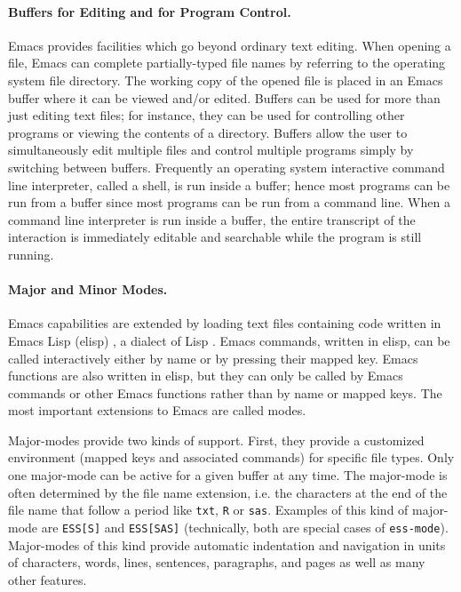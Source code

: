 \documentclass{article}
\newcommand{\stexttt}[1]{{\small\texttt{#1}}}
\begin{document}
\paragraph{Buffers for Editing and for Program Control.}
Emacs provides facilities which go beyond ordinary text editing.  When
opening a file, Emacs can complete partially-typed file names by
referring to the operating system file directory.  The working copy of
the opened file is placed in an Emacs buffer where it can be viewed
and/or edited.  Buffers can be used for more than just editing text
files; for instance, they can be used for controlling other programs
or viewing the contents of a directory.  Buffers allow the user to simultaneously
edit multiple files and control multiple
programs simply by switching between buffers.  Frequently an operating
system interactive command line interpreter, called a shell,
is run inside a buffer; hence most programs can be run from a buffer
since most programs can be run from a command line.  When a command line
interpreter is run inside a buffer, the entire
transcript of the interaction is immediately editable and searchable while the
program is still running.

\paragraph{Major and Minor Modes.}
Emacs capabilities are extended by loading text files containing code
written in Emacs Lisp (elisp) \citep{RChassell1999}, a dialect of Lisp
\citep{PGraham:1996}.  Emacs commands, written in elisp,
can be called interactively either by name or by pressing their mapped key.
Emacs functions are also written in elisp, but they can only be called
by Emacs commands or other Emacs functions rather than by
name or mapped keys.  The most important extensions to Emacs are called
modes.

Major-modes provide two kinds of support.
First, they provide a customized environment (mapped keys and associated
commands) for specific file types.  Only one major-mode can be active
for a given buffer at any time.  The major-mode is often determined by
the file name extension, i.e. the characters at the end of the file
name that follow a period like \stexttt{txt}, \stexttt{R} or
\stexttt{sas}.
Examples of this kind of major-mode are \stexttt{ESS[S]} and \stexttt{ESS[SAS]}
(technically, both are special cases of \stexttt{ess-mode}).
Major-modes of this
kind provide automatic indentation and navigation in units of characters,
words, lines, sentences, paragraphs, and pages as well as many other
features.
\end{document}
